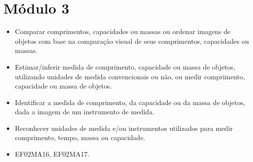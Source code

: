 \chapter{Módulo 3}


\vspace*{-1cm}


\begin{itemize}
\item Comparar comprimentos, capacidades ou massas ou ordenar imagens de
  objetos com base na comparação visual de seus comprimentos, capacidades ou massas.

\item Estimar/inferir medida de comprimento, capacidade ou massa de objetos,
  utilizando unidades de medida convencionais ou não, ou medir
  comprimento, capacidade ou massa de objetos.

\item Identificar a medida de comprimento, da capacidade ou da massa de
  objetos, dada a imagem de um instrumento de medida.

\item Reconhecer unidades de medida e/ou instrumentos utilizados para medir
  comprimento, tempo, massa ou capacidade.
\end{itemize}


\begin{itemize}
\item EF02MA16, EF02MA17.
\end{itemize}


